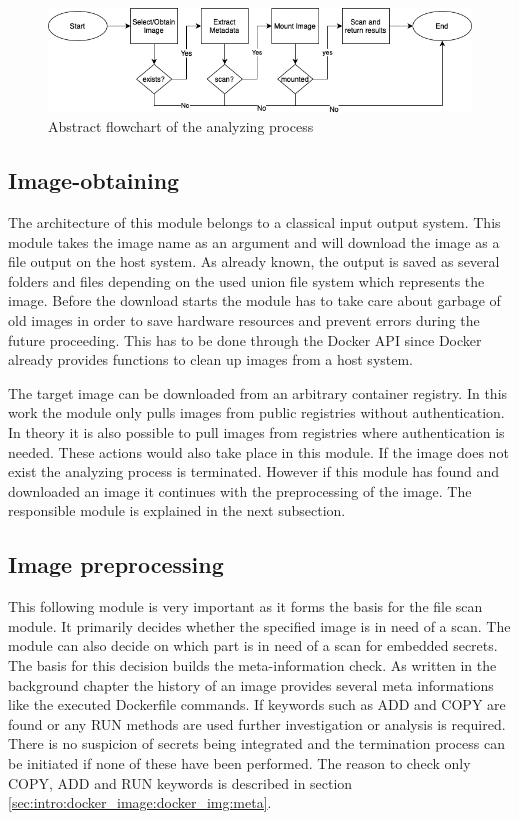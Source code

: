 \begin{figure}[htbp]
\centering
\includegraphics[width=1.0\textwidth]{gfx/examples/basic_workflow_scan}
\caption{Abstract flowchart of the analyzing process}
\label{ch:theory:analyzing process:fig}
\end{figure}

\subsection{Image-obtaining}
\label{ch:theory:analyzing_process:obtain}
The architecture of this module belongs to a classical input output system. This module takes the image name as an argument and will download the image as a file output on the host system. 
As already known, the output is saved as several folders and files depending on the used union file system which represents the image. 
Before the download starts the module has to take care about garbage of old images in order to save hardware resources and prevent errors during the future proceeding. 
This has to be done through the Docker API since Docker already provides functions to clean up images from a host system.

The target image can be downloaded from an arbitrary container registry.
In this work the module only pulls images from public registries without authentication. 
In theory it is also possible to pull images from registries where authentication is needed. 
These actions would also take place in this module.
If the image does not exist the analyzing process is terminated.
However if this module has found and downloaded an image it continues with the preprocessing of the image. 
The responsible module is explained in the next subsection.

\subsection{Image preprocessing}
\label{ch:theory:analyzing_process:prepro}
This following module is very important as it forms the basis for the file scan module. 
It primarily decides whether the specified image is in need of a scan.
The module can also decide on which part is in need of a scan for embedded secrets. 
The basis for this decision builds the meta-information check. 
As written in the background chapter the history of an image provides several meta informations like the executed Dockerfile commands.
If keywords such as ADD and COPY are found or any RUN methods are used further investigation or analysis is required.
There is no suspicion of secrets being integrated and the termination process can be initiated if none of these have been performed.
The reason to check only COPY, ADD and RUN keywords is described in section \ref{sec:intro:docker_image:docker_img:meta}. 

